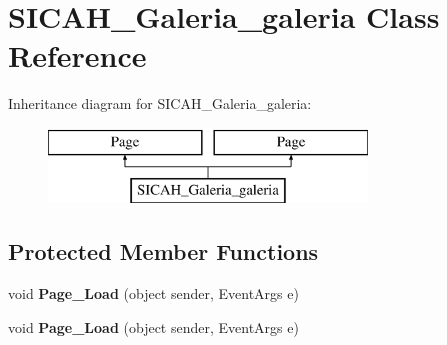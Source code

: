 \hypertarget{class_s_i_c_a_h___galeria__galeria}{}\section{S\+I\+C\+A\+H\+\_\+\+Galeria\+\_\+galeria Class Reference}
\label{class_s_i_c_a_h___galeria__galeria}
Inheritance diagram for S\+I\+C\+A\+H\+\_\+\+Galeria\+\_\+galeria\+:\begin{figure}[H]
\begin{center}
\leavevmode
\includegraphics[height=2.000000cm]{class_s_i_c_a_h___galeria__galeria}
\end{center}
\end{figure}
\subsection*{Protected Member Functions}
\begin{DoxyCompactItemize}
\item 
void {\bfseries Page\+\_\+\+Load} (object sender, Event\+Args e)\hypertarget{class_s_i_c_a_h___galeria__galeria_ae5d0b13c17e9bd507dbbe74e30e8bd45}{}\label{class_s_i_c_a_h___galeria__galeria_ae5d0b13c17e9bd507dbbe74e30e8bd45}

\item 
void {\bfseries Page\+\_\+\+Load} (object sender, Event\+Args e)\hypertarget{class_s_i_c_a_h___galeria__galeria_ae5d0b13c17e9bd507dbbe74e30e8bd45}{}\label{class_s_i_c_a_h___galeria__galeria_ae5d0b13c17e9bd507dbbe74e30e8bd45}

\end{DoxyCompactItemize}
